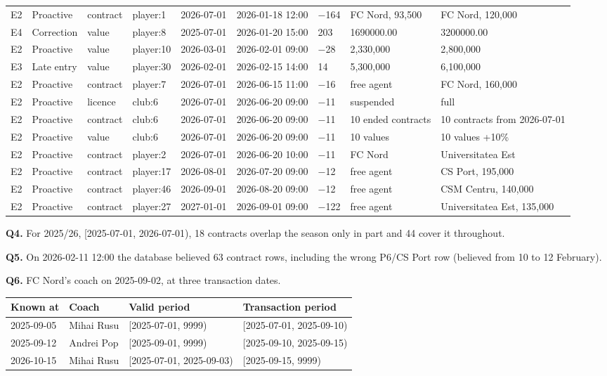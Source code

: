 \documentclass[10pt,a4paper]{article}
\begin{document}
{\begin{longtable}{@{}lllllllll@{}}
E2 & Proactive & contract & player:1 & 2026-07-01 & 2026-01-18 12:00 & $-$164 & FC Nord, 93,500 & FC Nord, 120,000\\
E4 & Correction & value & player:8 & 2025-07-01 & 2026-01-20 15:00 & 203 & 1690000.00 & 3200000.00\\
E2 & Proactive & value & player:10 & 2026-03-01 & 2026-02-01 09:00 & $-$28 & 2,330,000 & 2,800,000\\
E3 & Late entry & value & player:30 & 2026-02-01 & 2026-02-15 14:00 & 14 & 5,300,000 & 6,100,000\\
E2 & Proactive & contract & player:7 & 2026-07-01 & 2026-06-15 11:00 & $-$16 & free agent & FC Nord, 160,000\\
E2 & Proactive & licence & club:6 & 2026-07-01 & 2026-06-20 09:00 & $-$11 & suspended & full\\
E2 & Proactive & contract & club:6 & 2026-07-01 & 2026-06-20 09:00 & $-$11 & 10 ended contracts & 10 contracts from 2026-07-01\\
E2 & Proactive & value & club:6 & 2026-07-01 & 2026-06-20 09:00 & $-$11 & 10 values & 10 values +10\%\\
E2 & Proactive & contract & player:2 & 2026-07-01 & 2026-06-20 10:00 & $-$11 & FC Nord & Universitatea Est\\
E2 & Proactive & contract & player:17 & 2026-08-01 & 2026-07-20 09:00 & $-$12 & free agent & CS Port, 195,000\\
E2 & Proactive & contract & player:46 & 2026-09-01 & 2026-08-20 09:00 & $-$12 & free agent & CSM Centru, 140,000\\
E2 & Proactive & contract & player:27 & 2027-01-01 & 2026-09-01 09:00 & $-$122 & free agent & Universitatea Est, 135,000\\
\bottomrule
\end{longtable}}

\textbf{Q4.}  For 2025/26, [2025-07-01, 2026-07-01), 18 contracts overlap the season
only in part and 44 cover it throughout.

\textbf{Q5.}  On 2026-02-11 12:00 the database believed 63 contract rows, including
the wrong P6/CS Port row (believed from 10 to 12 February).

\textbf{Q6.}  FC Nord's coach on 2025-09-02, at three transaction dates.
\begin{center}
\footnotesize
\begin{tabular}{@{}llll@{}}
\toprule
Known at & Coach & Valid period & Transaction period\\
\midrule
2025-09-05 & Mihai Rusu & [2025-07-01, 9999) & [2025-07-01, 2025-09-10)\\
2025-09-12 & Andrei Pop & [2025-09-01, 9999) & [2025-09-10, 2025-09-15)\\
2026-10-15 & Mihai Rusu & [2025-07-01, 2025-09-03) & [2025-09-15, 9999)\\
\bottomrule
\end{tabular}
\end{center}
\end{document}
